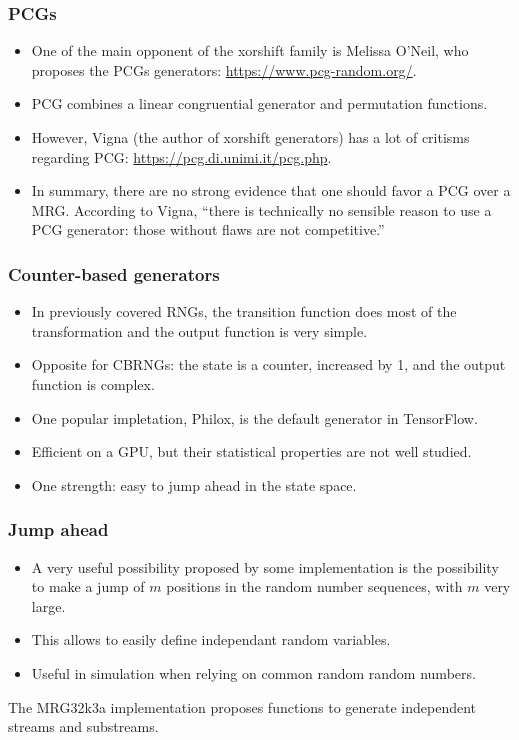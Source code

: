 \documentclass{beamer}
\begin{document}
\begin{frame}
\frametitle{PCGs}

\begin{itemize}
\item
One of the main opponent of the xorshift family is Melissa O'Neil, who proposes the PCGs generators:
\url{https://www.pcg-random.org/}.
\item
PCG combines a linear congruential generator and permutation functions.
\item
However, Vigna (the author of xorshift generators) has a lot of critisms regarding PCG: \url{https://pcg.di.unimi.it/pcg.php}.
\item
In summary, there are no strong evidence that one should favor a PCG over a MRG. According to Vigna, ``there is technically no sensible reason to use a PCG generator: those without flaws are not competitive.''
\end{itemize}

\end{frame}

\begin{frame}
\frametitle{Counter-based generators}

\begin{itemize}
\item In previously covered RNGs, the transition function does most of the transformation and the output function is very simple.
\item
Opposite for CBRNGs: the state is a counter, increased by 1, and the output function is complex.
\item
One popular impletation, Philox, is the default generator in TensorFlow.
\item 
Efficient on a GPU, but their statistical properties are not well studied.
\item
One strength: easy to jump ahead in the state space.
\end{itemize}

\end{frame}

\begin{frame}
\frametitle{Jump ahead}

\begin{itemize}
	\item 
A very useful possibility proposed by some implementation is the possibility to make a jump of $m$ positions in the random number sequences, with $m$ very large.
\item
This allows to easily define independant random variables.
\item
Useful in simulation when relying on common random random numbers.
\end{itemize}

The MRG32k3a implementation proposes functions to generate independent streams and substreams.

\end{frame}
\end{document}
